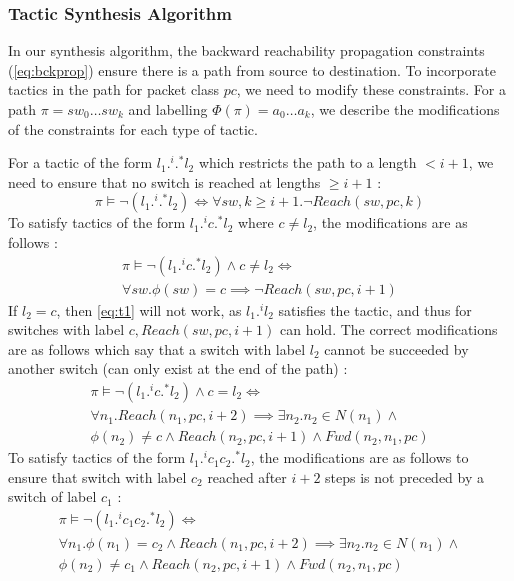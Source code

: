 \subsubsection{Tactic Synthesis Algorithm}
In our synthesis algorithm, the backward reachability propagation constraints (\cref{eq:bckprop}) ensure there is a path from source to destination. To incorporate tactics in the path for packet class $pc$, we need to modify these constraints. For a path $\pi = sw_0 \ldots sw_k$ and labelling $\Phi(\pi) = a_0 \ldots a_k$, we describe the modifications of the constraints for each type of tactic.

For a tactic of the form $l_1 .^i .^* l_2$ which restricts the path to a length $ < i + 1$, we need to ensure that no switch is reached at lengths $\geq i+1$ : 
\begin{equation}
	\pi \vDash \neg (l_1 .^i .^* l_2) \Leftrightarrow \forall sw,k \geq i + 1. \neg Reach(sw, pc, k)
\end{equation}
To satisfy tactics of the form $l_1  .^i c .^* l_2$ where $c \not= l_2$, the modifications are as follows :
\begin{multline} \label{eq:t1}
\pi \vDash \neg (l_1 .^i c .^* l_2) \wedge c \not= l_2 \Leftrightarrow \\ \forall sw. \phi(sw) = c \implies \neg Reach(sw, pc, i + 1)
\end{multline}
If $l_2 = c$, then \cref{eq:t1} will not work, as $l_1 .^i l_2$ satisfies the tactic, and thus for switches with label $c,Reach(sw,pc,i+1)$ can hold. The correct modifications are as follows which say that a switch with label $l_2$ cannot be succeeded by another switch (can only exist at the end of the path) : 
\begin{multline} \label{eq:t2}
 \pi \vDash \neg (l_1 .^i c .^* l_2) \wedge c = l_2 \Leftrightarrow \\ 
 \forall n_1. Reach(n_1,pc,i + 2) \implies \exists n_2.  n_2 \in N(n_1) \wedge \\ \phi(n_2) \not= c \wedge 
 Reach(n_2,pc,i+1) \wedge Fwd(n_2,n_1,pc)
\end{multline}
To satisfy tactics of the form $l_1  .^i c_1 c_2 .^* l_2$, the modifications are as follows to ensure that switch with label $c_2$ reached after $i + 2$ steps is not preceded by a switch of label $c_1$ : 
\begin{multline} \label{eq:t3}
\pi \vDash \neg (l_1 .^i c_1 c_2 .^* l_2) \Leftrightarrow \\ 
\forall n_1. \phi(n_1) = c_2 \wedge Reach(n_1,pc,i + 2) \implies \exists n_2.  n_2 \in N(n_1) \wedge \\ \phi(n_2) \not= c_1 \wedge 
Reach(n_2,pc,i+1) \wedge Fwd(n_2,n_1,pc)
\end{multline}
